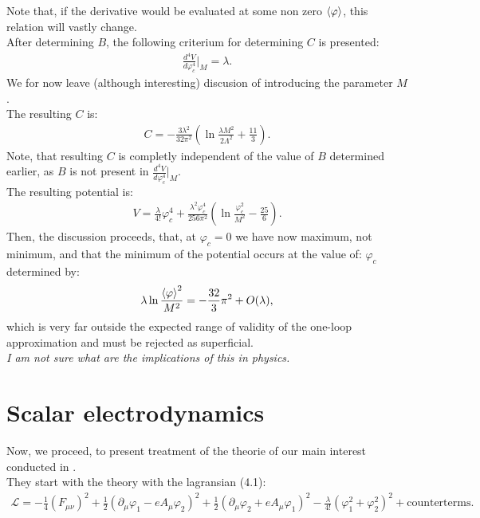 Note that, if the derivative would be evaluated at some non zero ${\langle\varphi\rangle}$, this relation will 
vastly change. \\
After determining $B$, the following criterium for determining $C$ is presented:
\begin{align}
\frac{d^4V}{d\varphi_c^4}\Big|_M=\lambda.
\end{align}
We for now leave (although interesting) discusion of introducing the parameter $M$. \\
The resulting $C$ is:
\begin{align}
C=-\frac{3\lambda^2}{32\pi^2}\left(\ln\frac{\lambda M^2}{2\Lambda^2}+\frac{11}{3}\right).
\end{align}
Note, that resulting $C$ is completly independent of the value of $B$ determined 
earlier\label{CBreason}, as $B$ is not present in $\frac{d^4V}{d\varphi_c^4}\Big|_M$. \\
The resulting potential is:
\begin{align}
V=\frac{\lambda}{4!}\varphi_c^4+\frac{\lambda^2\varphi_c^4}{256\pi^2}\left(\ln
\frac{\varphi_c^2}{M^2}-\frac{25}{6}\right).
\end{align}
Then, the discussion proceeds, that, at $\varphi_c = 0$ we have now maximum, not minimum, 
and that the minimum of the potential occurs at the value of: 
$\varphi_c$ determined by:
\begin{align}
\lambda\ln\frac{{\langle\varphi\rangle}^2}{M^2}=-\frac{32}{3}\pi^2+O(\lambda),
\end{align}
which is very far outside the expected range of validity of the one-loop approximation and must be 
rejected as superficial. \\
\textit{I am not sure what are the implications of this in physics.}
\section{Scalar electrodynamics}
Now, we proceed, to present treatment of the theorie of our main interest conducted in 
\cite{Coleman1973}. \\
They start with the theory with the lagransian \cite{Coleman1973}(4.1):
\begin{align}\label{CW_electrodynamics}
\mathcal{L} = -\frac{1}{4}(F_{\mu\nu})^2+\frac{1}{2}(\partial_\mu\varphi_1-eA_\mu\varphi_2)^2 + 
\frac{1}{2}(\partial_\mu\varphi_2+eA_\mu\varphi_1)^2-\frac{\lambda}{4!}(\varphi_1^2+\varphi_2^2)^2 
 + \textrm{counterterms}.
\end{align}

